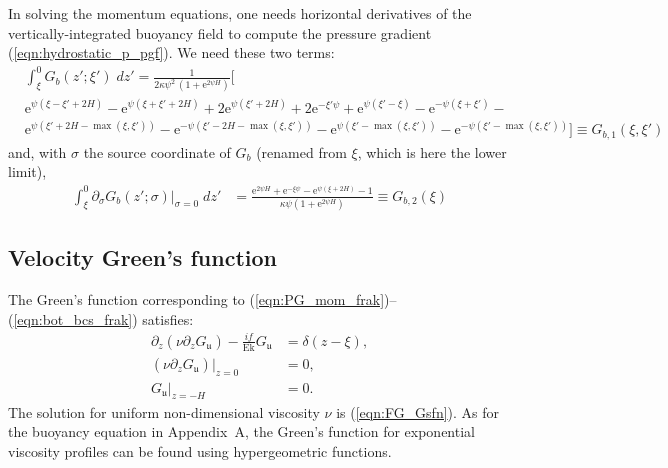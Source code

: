 \documentclass{ametsocV6.2}
\newcommand{\appbEqnSoln}{Appendix~A}
\begin{document}
In solving the momentum equations, one needs horizontal derivatives of the vertically-integrated buoyancy field to compute the pressure gradient (\ref{eqn:hydrostatic_p_pgf}).
We need these two terms:
\begin{align}
& \int_{\xi}^{0} G_b(z'; \xi') \; dz'   =  \frac{1}{ 2 \kappa \psi^{2} \, \left(1 + \mathrm{e}^{2 \psi H} \right) }\bigg[ \nonumber \\
& \mathrm{e}^{\psi \left( \xi  - \xi' + 2  H \right)} -
 \mathrm{e}^{\psi \left( \xi + \xi' + 2 H \right)} +
2 \mathrm{e}^{\psi \left( \xi' + 2  H  \right) } + 
2 \mathrm{e}^{ - \xi' \psi} +  
\mathrm{e}^{  \psi \left(  \xi' - \xi \right)} - 
\mathrm{e}^{ - \psi \left( \xi + \xi' \right)} - \nonumber \\
& \mathrm{e}^{ \psi \left( \xi' + 2  H  -  \max \left( \xi, \xi' \right)\right)} - 
\mathrm{e}^{ - \psi \left( \xi' - 2  H  -  \max\left( \xi, \xi' \right) \right)} -
\mathrm{e}^{ \psi \left( \xi'  -  \max \left( \xi, \xi' \right) \right)} - 
\mathrm{e}^{ - \psi \left( \xi' - \max \left( \xi, \xi' \right) \right)} 
\bigg] \equiv G_{b,1}(\xi,\xi')
\label{eqn:term1}
\end{align}
and, with $\sigma$ the source coordinate of $G_b$ (renamed from $\xi$, which is here the lower limit),
\begin{align}
\int_{\xi}^{0} \partial_\sigma G_b(z';\sigma) |_{\sigma = 0} \; dz' & = 
\frac{ \mathrm{e}^{2 \psi H} + \mathrm{e}^{ - \xi \psi} - \mathrm{e}^{\psi \left( \xi + 2 H \right)} - 1 }{\kappa \psi \left( 1 + \mathrm{e}^{2 \psi H}\right)} \equiv G_{b,2}(\xi)
\label{eqn:term2}
\end{align}


\appendix[B]

\subsection*{Velocity Green's function}
The Green's function corresponding to (\ref{eqn:PG_mom_frak})--(\ref{eqn:bot_bcs_frak}) satisfies:
\begin{align}
\partial_z \left( \nu \partial_z G_\mathfrak{u} \right)  - \frac{i f}{\mathrm{Ek}}  G_\mathfrak{u} & = \delta(z - \xi) , \label{eqn:G_u_ode} \\
\left( \nu \partial_z G_\mathfrak{u} \right)|_{z = 0} & = 0 , \label{eqn:G_u_sfc_bc}
 \\
G_\mathfrak{u} |_{z = - H} & = 0 .
\label{eqn:G_u_bot_bc}
\end{align}
The solution for uniform non-dimensional viscosity $\nu$ is (\ref{eqn:FG_Gsfn}).
As for the buoyancy equation in \appbEqnSoln , the Green's function for exponential viscosity profiles can be found using hypergeometric functions.
\end{document}
